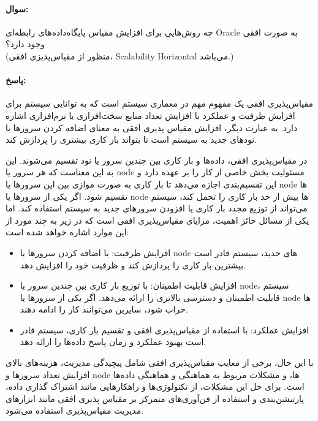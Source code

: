 \documentclass[a4paper,10pt]{article}
\begin{document}
    \paragraph{سوال:} چه روش‌هایی برای افزایش مقیاس پایگاه‌داده‌های رابطه‌ای Oracle به صورت افقی وجود دارد؟\\(منظور از مقیاس‌پذیزی افقی، Scalability Horizontal می‌باشد.)

    \paragraph{پاسخ:} مقیاس‌پذیری افقی یک مفهوم مهم در معماری سیستم است که به توانایی سیستم برای افزایش ظرفیت و عملکرد با افزایش تعداد منابع سخت‌افزاری یا نرم‌افزاری اشاره دارد. به عبارت دیگر، افزایش مقیاس پذیری افقی به معنای اضافه کردن سرورها یا نودهای جدید به سیستم است تا بتواند بار کاری بیشتری را پردازش کند.

    در مقیاس‌پذیری افقی، داده‌ها و بار کاری بین چندین سرور یا نود تقسیم می‌شوند. این به این معناست که هر سرور یا node مسئولیت بخش خاصی از کار را بر عهده دارد و این تقسیم‌بندی اجازه می‌دهد تا بار کاری به صورت موازی بین این سرورها یا node ها تقسیم شود. اگر یکی از سرورها یا node ها بیش از حد بار کاری را تحمل کند، سیستم می‌تواند از توزیع مجدد بار کاری یا افزودن سرورهای جدید به سیستم استفاده کند. اما یکی از مسائل حائز اهمیت، مزایای مقیاس‌پذیری افقی است که در زیر به چند مورد از این موارد اشاره خواهد شده است:

    \begin{itemize}
        
        \item افزایش ظرفیت: با اضافه کردن سرورها یا node های جدید، سیستم قادر است بیشترین بار کاری را پردازش کند و ظرفیت خود را افزایش دهد.

        \item افزایش قابلیت اطمینان: با توزیع بار کاری بین چندین سرور یا node، سیستم قابلیت اطمینان و دسترسی بالاتری را ارائه می‌دهد. اگر یکی از سرورها یا node ها خراب شود، سایرین می‌توانند کار را ادامه دهند.

        \item افزایش عملکرد: با استفاده از مقیاس‌پذیری افقی و تقسیم بار کاری، سیستم قادر است بهبود عملکرد و زمان پاسخ داده‌ها را ارائه دهد.

    \end{itemize}

    با این حال، برخی از معایب مقیاس‌پذیری افقی شامل پیچیدگی مدیریت، هزینه‌های بالای افزایش تعداد سرورها و node ها، و مشکلات مربوط به هماهنگی و هماهنگی داده‌ها است. برای حل این مشکلات، از تکنولوژی‌ها و راهکارهایی مانند اشتراک گذاری داده، پارتیشن‌بندی و استفاده از فن‌آوری‌های متمرکز بر مقیاس پذیری افقی مانند ابزارهای مدیریت مقیاس‌پذیری استفاده می‌شود.
\end{document}

